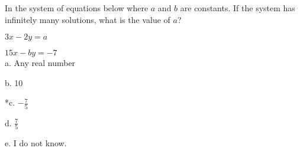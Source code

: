 
In the system of equations below where \( a \) and \( b \) are constants. If the system has infinitely many solutions, what is the value of \( a \)?

\( 3x - 2y = a \)

\( 15x - by = - 7 \)\\

a. Any real number

b. 10

*c. \( - \frac{7}{5} \)

d. \( \frac{7}{5} \)

e. I do not know.\\
